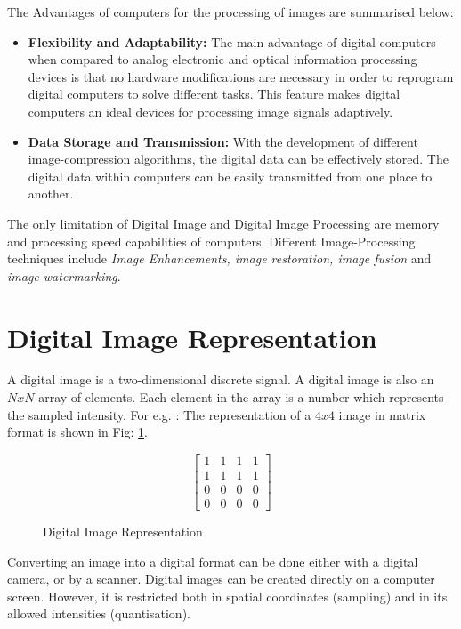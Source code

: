 The Advantages of computers for the processing of images are summarised below:
\begin{itemize}
    \item \textbf{Flexibility and Adaptability:} The main advantage of digital computers when compared to analog electronic and optical information processing devices is that no hardware modifications are necessary in order to reprogram digital computers to solve different tasks. This feature makes digital computers an ideal devices for processing image signals adaptively.
    \item \textbf{Data Storage and Transmission:} With the development of different image-compression algorithms, the digital data can be effectively stored. The digital data within computers can be easily transmitted from one place to another.
\end{itemize}

The only limitation of Digital Image and Digital Image Processing are memory and processing speed capabilities of computers. Different Image-Processing techniques include \textit{Image Enhancements, image restoration, image fusion} and \textit{image watermarking}.

\section{Digital Image Representation}

A digital image is a two-dimensional discrete signal.
A digital image is also an $NxN$ array of elements.
Each element in the array is a number which represents the sampled intensity.
For e.g. : The representation of a $4x4$ image in matrix format is shown in Fig: \ref{matrix_view}.

\begin{figure}[h]
    
\begin{equation*}
    \begin{bmatrix}
    1 & 1 & 1 & 1\\
    1 & 1 & 1 & 1\\
    0 & 0 & 0 & 0\\
    0 & 0 & 0 & 0
    \end{bmatrix}
\end{equation*}

    \caption{Digital Image Representation}
    \label{matrix_view}
\end{figure}

Converting an image into a digital format can be done either with a digital camera, or by a scanner.
Digital images can be created directly on a computer screen.
However, it is restricted both in spatial coordinates (sampling) and in its allowed intensities (quantisation).

